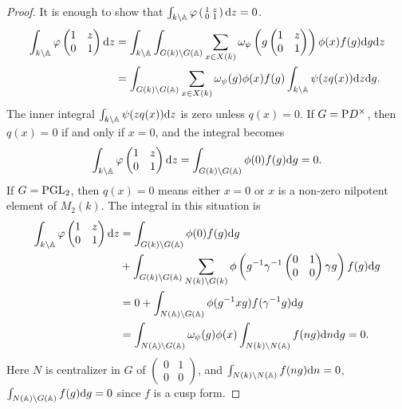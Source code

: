 \begin{proof}
It is enough to show that $\int_{k\backslash \mathbb{A}} \varphi\left(\begin{smallmatrix}
    1 & z \\ 0 & 1
\end{smallmatrix}\right)\mathrm{d} z = 0$.
\begin{align*}
\int_{k \backslash \mathbb{A}} \varphi \begin{pmatrix}
    1 & z \\ 0 & 1
\end{pmatrix} \mathrm{d} z &= \int_{k \backslash \mathbb{A}} \int_{G(k) \backslash G(\mathbb{A})}  \sum_{x \in X(k)} \omega_\psi\left(g \begin{pmatrix}
    1 & z \\ 0 & 1
\end{pmatrix}\right)\phi(x) f(g) \mathrm{d} g \mathrm{d} z \\
&= \int_{G(k) \backslash G(\mathbb{A})} \sum_{x \in X(k)} \omega_\psi(g) \phi(x) f(g) \int_{k \backslash \mathbb{A}} \psi(z q(x)) \mathrm{d} z \mathrm{d} g.
\end{align*}
The inner integral $\int_{k \backslash \mathbb{A}} \psi(z q(x)) \mathrm{d} z$ is zero unless $q(x) = 0$.
If $G = \mathrm{P} D^\times$, then $q(x) = 0$ if and only if $x = 0$, and the integral becomes
\[
\int_{k \backslash \mathbb{A}} \varphi \begin{pmatrix}
    1 & z \\ 0 & 1
\end{pmatrix} \mathrm{d} z = \int_{G(k) \backslash G(\mathbb{A})} \phi(0) f(g) \mathrm{d} g = 0.
\]
If $G = \mathrm{PGL}_2$, then $q(x)=0$ means either $x = 0$ or $x$ is a non-zero nilpotent element of $M_2(k)$. The integral in this situation is
\begin{align*}
    \int_{k \backslash \mathbb{A}} \varphi \begin{pmatrix}
        1 & z \\ 0 & 1
    \end{pmatrix} \mathrm{d} z &= \int_{G(k) \backslash G(\mathbb{A})} \phi(0) f(g) \mathrm{d} g \\
    &+ \int_{G(k) \backslash G(\mathbb{A})} \sum_{N(k) \backslash G(k)} \phi \left(g^{-1} \gamma^{-1} \begin{pmatrix}
        0 & 1 \\ 0 & 0
    \end{pmatrix} \gamma g\right) f(g) \mathrm{d} g \\
    &= 0 + \int_{N(\mathbb{A}) \backslash G(\mathbb{A})} \phi(g^{-1} xg) f(\gamma^{-1} g) \mathrm{d} g \\
    &= \int_{N(\mathbb{A}) \backslash G(\mathbb{A})} \omega_\psi(g) \phi(x) \int_{N(k) \backslash N(\mathbb{A})} f(ng) \mathrm{d} n \mathrm{d} g = 0.
\end{align*}
Here $N$ is centralizer in $G$ of $\left(\begin{smallmatrix}
    0 & 1 \\ 0& 0
\end{smallmatrix}\right)$, and $\int_{N(k) \backslash N(\mathbb{A})} f(ng) \mathrm{d} n = 0$, $\int_{N(\mathbb{A}) \backslash G(\mathbb{A})} f(g) \mathrm{d} g = 0$  since $f$ is a cusp form.
\end{proof}

